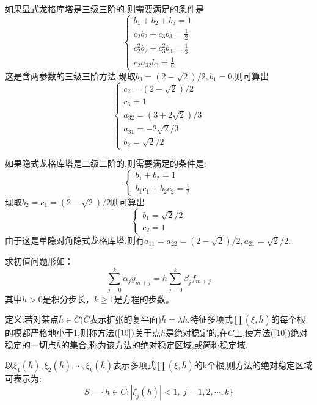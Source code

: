 \documentclass[12pt,a4paper]{article}
\begin{document}
如果显式龙格库塔是三级三阶的,则需要满足的条件是
\begin{equation}
\begin{cases}
b_{1}+b_{2}+b_{3}=1\\
c_{2}b_{2}+c_{3}b_{3}=\frac{1}{2}\\
c_{2}^2b_{2}+c_{3}^2b_{3}=\frac{1}{3}\\
c_{2}a_{32}b_{3}=\frac{1}{6}
\end{cases}
\end{equation}
这是含两参数的三级三阶方法.现取$b_{3}=(2-\sqrt{2})/2,b_{1}=0.$则可算出
\begin{equation}
\begin{cases}
c_{2}=(2-\sqrt{2})/2\\
c_{3}=1\\
a_{32}=(3+2\sqrt{2})/3\\
a_{31}=-2\sqrt{2}/3\\
b_{2}=\sqrt{2}/2
\end{cases}
\end{equation}

如果隐式龙格库塔是二级二阶的,则需要满足的条件是:
\begin{equation}
\begin{cases}
b_{1}+b_{2}=1\\
b_{1}c_{1}+b_{2}c_{2}=\frac{1}{2}
\end{cases}
\end{equation}
现取$b_{2}=c_{1}=(2-\sqrt{2})/2$则可算出
\begin{equation}
\begin{cases}
b_{1}=\sqrt{2}/2\\
c_{2}=1
\end{cases}
\end{equation}
由于这是单隐对角隐式龙格库塔,则有$a_{11}=a_{22}=(2-\sqrt{2})/2,a_{21}=\sqrt{2}/2$.

求初值问题形如：
\begin{equation}
\sum_{j=0}^{k}\alpha_{j}y_{m+j}=h\sum_{j=0}^{k}\beta_{j}f_{m+j}
\label{10}
\end{equation}
其中$h>0$是积分步长，$k\ge 1$是方程的步数。

定义:若对某点$\bar{h}\in \bar{C}$($\bar{C}$表示扩张的复平面)$\bar{h}=\lambda h$.特征多项式$\prod(\xi ,\bar{h})$的每个根的模都严格地小于1,则称方法$(\ref{10})$关于点$\bar{h}$是绝对稳定的,在$\bar{C}$上,使方法(\ref{10})绝对稳定的一切点$\bar{h}$的集合,称为该方法的绝对稳定区域,或简称稳定域.

以$\xi_{1}(\bar{h}),\xi_{2}(\bar{h}),\cdots,\xi_{k}(\bar{h})$表示多项式$\prod(\xi,\bar{h})$的k个根,则方法的绝对稳定区域可表示为:
\begin{equation}
S=\{ \bar{h}\in\bar{C}:|\xi_{j}(\bar{h})|<1,~j=1,2,\cdots,k \}
\end{equation}
\end{document}
